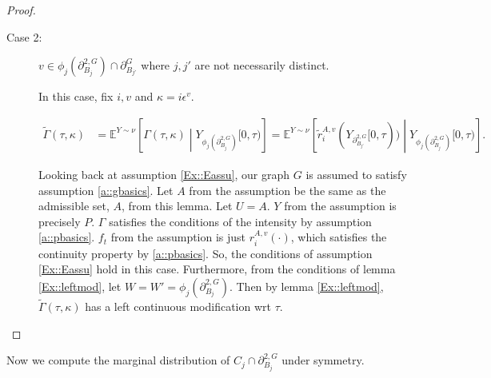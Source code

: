 \documentclass[12pt]{article}
\newcommand{\skipLine}{\vspace{12pt}}
\newcommand{\mb}{\mathbb}
\newcommand{\ep}{\epsilon}
\newcommand{\ind}{\hspace{24pt}}
\newcommand{\exmu}[2]{\mb{E}^{#1}\left[#2\right]}	%
\newcommand{\gneigh}[2]{\partial^{#1}_{#2}}			%
\newcommand{\dgneigh}[2]{\partial^{2,#1}_{#2}}		%
\newcommand{\rate}{r}								%
\newcommand{\vind}[1]{_{#1}}						%
\newcommand{\tmi}[1]{#1}							%
\newcommand{\stpara}[1]{_{#1}}						%
\newcommand{\gvpara}[2]{^{#1,#2}}					%
\newcommand{\psize}{\ell}							%
\newcommand{\Xg}{Y}									%
\newcommand{\brate}{\alt{\rate}}					%
\newcommand{\inte}[1]{{#1}^\mathrm{o}}				%
\newcommand{\alt}[1]{\tilde{#1}}					%
\newcommand{\rt}{\tau}								%
\renewcommand{\mark}{\kappa}						%
\newcommand{\ratee}{\Gamma}							%
\newcommand{\cratee}{\alt{\ratee}}					%
\newcommand{\rp}{P}									%
\newcommand{\mm}{\nu}								%
\newcommand{\ev}[1]{\ep^{#1}}						%
\newtheorem{lem}[thms]{Lemma}
\begin{document}
\begin{proof}
\begin{description}
\skipLine

\item[Case 2: ] \(v \in \phi_j(\dgneigh{G}{B_j})\cap\gneigh{G}{B_{j'}}\) where \(j,j'\) are not necessarily distinct.

In this case, fix \(i,v\) and \(\mark = i\ev{v}\).

\begin{align*}
\cratee(\rt,\mark) &= \exmu{\Xg\sim\mm}{\ratee(\rt,\mark)\middle|\Xg\vind{\phi_j(\dgneigh{G}{B_j})}\tmi{[0,\rt)}} = \exmu{\Xg\sim\mm}{\brate\gvpara{A}{v}\stpara{i}(\Xg\vind{\dgneigh{G}{B_{j'}}}\tmi{[0,\rt)})\middle|\Xg\vind{\phi_j(\dgneigh{G}{B_j})}\tmi{[0,\rt)}}.
\end{align*}

Looking back at assumption \ref{Ex::Eassu}, our graph \(G\) is assumed to satisfy assumption \ref{a::gbasics}. Let \(A\) from the assumption be the same as the admissible set, \(A\), from this lemma. Let \(U = A\). \(\Xg\) from the assumption is precisely \(\rp\). \(\ratee\) satisfies the conditions of the intensity by assumption \ref{a::pbasics}. \(f_t\) from the assumption is just \(\rate\gvpara{A}{v}\stpara{i}(\cdot)\), which satisfies the continuity property by \ref{a::pbasics}. So, the conditions of assumption \ref{Ex::Eassu} hold in this case. Furthermore, from the conditions of lemma \ref{Ex::leftmod}, let \(W = W' = \phi_j(\dgneigh{G}{B_j})\). Then by lemma \ref{Ex::leftmod}, \(\cratee(\rt,\mark)\) has a left continuous modification wrt \(\rt\).
\end{description}
\end{proof}

Now we compute the marginal distribution of \(C_j\cap\dgneigh{G}{B_j}\) under symmetry. 
%
%
\end{document}
